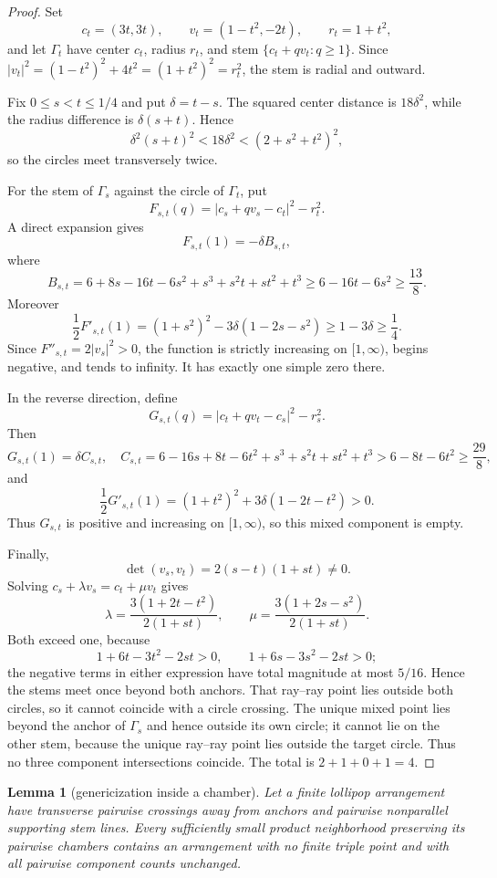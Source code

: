 \documentclass[11pt]{article}
\theoremstyle{plain}
\newtheorem{lemma}[theorem]{Lemma}
\theoremstyle{definition}
\theoremstyle{remark}
\newcommand{\1}{\mathbf 1}
\begin{document}
\begin{proof}
Set
\[
 c_t=(3t,3t),\qquad v_t=(1-t^2,-2t),\qquad r_t=1+t^2,
\]
and let $\Gamma_t$ have center $c_t$, radius $r_t$, and stem
$\{c_t+qv_t:q\geq1\}$.  Since
$|v_t|^2=(1-t^2)^2+4t^2=(1+t^2)^2=r_t^2$, the stem is radial and outward.

Fix $0\leq s<t\leq1/4$ and put $\delta=t-s$.  The squared center distance is
$18\delta^2$, while the radius difference is $\delta(s+t)$.  Hence
\[
 \delta^2(s+t)^2<18\delta^2<(2+s^2+t^2)^2,
\]
so the circles meet transversely twice.

For the stem of $\Gamma_s$ against the circle of $\Gamma_t$, put
\[
 F_{s,t}(q)=|c_s+qv_s-c_t|^2-r_t^2.
\]
A direct expansion gives
\[
 F_{s,t}(1)=-\delta B_{s,t},
\]
where
\[
 B_{s,t}=6+8s-16t-6s^2+s^3+s^2t+st^2+t^3
 \geq6-16t-6s^2\geq\frac{13}{8}.
\]
Moreover
\[
 \frac12F'_{s,t}(1)
 =(1+s^2)^2-3\delta(1-2s-s^2)
 \geq1-3\delta\geq\frac14.
\]
Since $F''_{s,t}=2|v_s|^2>0$, the function is strictly increasing on
$[1,\infty)$, begins negative, and tends to infinity.  It has exactly one
simple zero there.

In the reverse direction, define
\[
 G_{s,t}(q)=|c_t+qv_t-c_s|^2-r_s^2.
\]
Then
\[
 G_{s,t}(1)=\delta C_{s,t},
\quad
 C_{s,t}=6-16s+8t-6t^2+s^3+s^2t+st^2+t^3
 >6-8t-6t^2\geq\frac{29}{8},
\]
and
\[
 \frac12G'_{s,t}(1)
 =(1+t^2)^2+3\delta(1-2t-t^2)>0.
\]
Thus $G_{s,t}$ is positive and increasing on $[1,\infty)$, so this mixed
component is empty.

Finally,
\[
 \det(v_s,v_t)=2(s-t)(1+st)\ne0.
\]
Solving $c_s+\lambda v_s=c_t+\mu v_t$ gives
\[
 \lambda=\frac{3(1+2t-t^2)}{2(1+st)},\qquad
 \mu=\frac{3(1+2s-s^2)}{2(1+st)}.
\]
Both exceed one, because
\[
 1+6t-3t^2-2st>0,
 \qquad 1+6s-3s^2-2st>0;
\]
the negative terms in either expression have total magnitude at most
$5/16$.  Hence the stems meet once beyond both anchors.  That ray--ray point
lies outside both circles, so it cannot coincide with a circle crossing.  The
unique mixed point lies beyond the anchor of $\Gamma_s$ and hence outside
its own circle; it cannot lie on the other stem, because the unique ray--ray
point lies outside the target circle.  Thus no three component intersections
coincide.  The total is $2+1+0+1=4$.
\end{proof}

\begin{lemma}[genericization inside a chamber]\label{lem:genericize}
Let a finite lollipop arrangement have transverse pairwise crossings away from
anchors and pairwise nonparallel supporting stem lines.  Every sufficiently
small product neighborhood preserving its pairwise chambers contains an
arrangement with no finite triple point and with all pairwise component counts
unchanged.
\end{lemma}
\end{document}
